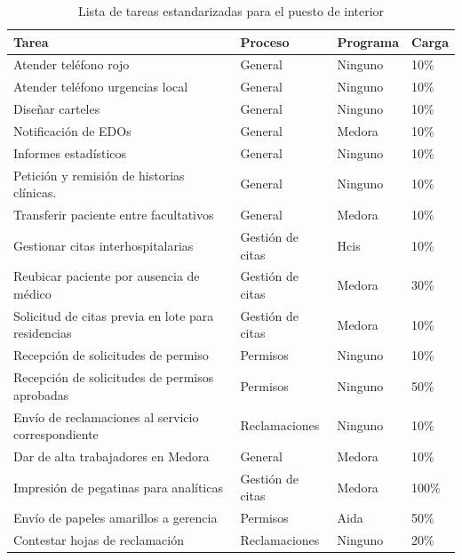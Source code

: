 \begin{table}
    \centering
    \begin{tabular}{p{8cm}lll}
        \toprule
        Tarea                                                & Proceso          & Programa & Carga \\
        \midrule
        Atender teléfono rojo                                & General          & Ninguno  & 10\%  \\
        Atender teléfono urgencias local                     & General          & Ninguno  & 10\%  \\
        Diseñar carteles                                     & General          & Ninguno  & 10\%  \\
        Notificación de EDOs                                 & General          & Medora   & 10\%  \\
        Informes estadísticos                                & General          & Ninguno  & 10\%  \\
        Petición y remisión de historias clínicas.           & General          & Ninguno  & 10\%  \\
        Transferir paciente entre facultativos               & General          & Medora   & 10\%  \\
        Gestionar citas interhospitalarias                   & Gestión de citas & Hcis     & 10\%  \\
        Reubicar paciente por ausencia de médico             & Gestión de citas & Medora   & 30\%  \\
        Solicitud de citas previa en lote para   residencias & Gestión de citas & Medora   & 10\%  \\
        Recepción de solicitudes de permiso                  & Permisos         & Ninguno  & 10\%  \\
        Recepción de solicitudes de permisos aprobadas       & Permisos         & Ninguno  & 50\%  \\
        Envío de reclamaciones al servicio correspondiente   & Reclamaciones    & Ninguno  & 10\%  \\
        Dar de alta trabajadores en Medora                   & General          & Medora   & 10\%  \\
        Impresión de pegatinas para analíticas               & Gestión de citas & Medora   & 100\% \\
        Envío de papeles   amarillos a gerencia              & Permisos         & Aida     & 50\%  \\
        Contestar hojas de reclamación                       & Reclamaciones    & Ninguno  & 20\%  \\
        \bottomrule
    \end{tabular}
    \caption{Lista de tareas estandarizadas para el puesto de interior}
    \label{tab:tareas-interior}
\end{table}

